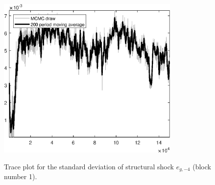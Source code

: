 \begin{figure}[H]
\centering
  \includegraphics[width=0.8\textwidth]{BRS_sectoral_KK/graphs/TracePlot_SE_e_g_news_blck_1}\\
    \caption{Trace plot for the standard deviation of structural shock ${e_{g,-4}}$ (block number 1).}
\end{figure}
